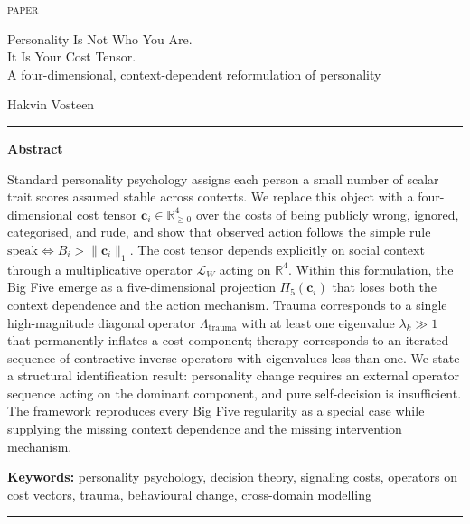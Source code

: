 \documentclass[12pt,a4paper]{article}
\begin{document}
{\small\scshape paper}

\vspace{0.8cm}

{\LARGE Personality Is Not Who You Are.\\[2pt]
It Is Your Cost Tensor.\\[6pt]
\normalsize A four-dimensional, context-dependent reformulation of personality}

\vspace{0.7cm}

Hakvin Vosteen

\vspace{0.6cm}

\noindent\rule{\textwidth}{0.4pt}

\textbf{Abstract}

\vspace{0.2em}

Standard personality psychology assigns each person a small number of scalar trait scores assumed stable across contexts. We replace this object with a four-dimensional cost tensor $\mathbf{c}_i \in \mathbb{R}^4_{\geq 0}$ over the costs of being publicly wrong, ignored, categorised, and rude, and show that observed action follows the simple rule $\text{speak} \Leftrightarrow B_i > \|\mathbf{c}_i\|_1$. The cost tensor depends explicitly on social context through a multiplicative operator $\mathcal{L}_W$ acting on $\mathbb{R}^4$. Within this formulation, the Big Five emerge as a five-dimensional projection $\Pi_5(\mathbf{c}_i)$ that loses both the context dependence and the action mechanism. Trauma corresponds to a single high-magnitude diagonal operator $\Lambda_{\mathrm{trauma}}$ with at least one eigenvalue $\lambda_k \gg 1$ that permanently inflates a cost component; therapy corresponds to an iterated sequence of contractive inverse operators with eigenvalues less than one. We state a structural identification result: personality change requires an external operator sequence acting on the dominant component, and pure self-decision is insufficient. The framework reproduces every Big Five regularity as a special case while supplying the missing context dependence and the missing intervention mechanism.

\vspace{0.4em}

{\small\textbf{Keywords:} personality psychology, decision theory, signaling costs, operators on cost vectors, trauma, behavioural change, cross-domain modelling}

\noindent\rule{\textwidth}{0.4pt}
\end{document}
